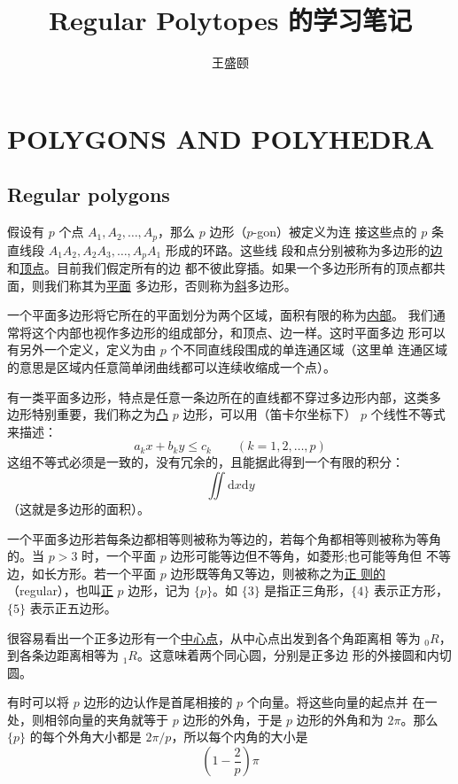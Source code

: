 \documentclass[cs4size,a4paper,adobefonts,openany]{ctexbook}
\newcommand{\pname}[1]{\underline{#1}}
\numberwithin{equation}{section}
\begin{document}
\title{\bfseries Regular Polytopes 的学习笔记}
\author{王盛颐}
\date{}
\maketitle
\setcounter{page}{1}
\chapter{POLYGONS AND POLYHEDRA}
\section{Regular polygons}
假设有 $p$ 个点 $A_1,A_2,\dots,A_p$，那么 $p$ 边形（$p$-gon）被定义为连
接这些点的 $p$ 条直线段 $A_1A_2,A_2A_3,\dots,A_pA_1$ 形成的环路。这些线
段和点分别被称为多边形的\pname{边}和\pname{顶点}。目前我们假定所有的边
都不彼此穿插。如果一个多边形所有的顶点都共面，则我们称其为\pname{平面}
多边形，否则称为\pname{斜}多边形。

一个平面多边形将它所在的平面划分为两个区域，面积有限的称为\pname{内部}。
我们通常将这个内部也视作多边形的组成部分，和顶点、边一样。这时平面多边
形可以有另外一个定义，定义为由 $p$ 个不同直线段围成的单连通区域（这里单
  连通区域的意思是区域内任意简单闭曲线都可以连续收缩成一个点）。

有一类平面多边形，特点是任意一条边所在的直线都不穿过多边形内部，这类多
边形特别重要，我们称之为\pname{凸} $p$ 边形，可以用（笛卡尔坐标下）
$p$ 个线性不等式来描述：
\[
a_kx+b_ky \leq c_k\qquad (k=1,2,\dots,p)
\]
这组不等式必须是一致的，没有冗余的，且能据此得到一个有限的积分：
\[
\iint\text{d}x\text{d}y
\]
（这就是多边形的面积）。

一个平面多边形若每条边都相等则被称为等边的，若每个角都相等则被称为等角
的。当 $p>3$ 时，一个平面 $p$ 边形可能等边但不等角，如菱形;也可能等角但
不等边，如长方形。若一个平面 $p$ 边形既等角又等边，则被称之为\pname{正
  则的} （regular），也叫\pname{正} $p$ 边形，记为 $\{p\}$。如 $\{3\}$
是指正三角形，$\{4\}$ 表示正方形，$\{5\}$ 表示正五边形。

很容易看出一个正多边形有一个\pname{中心点}，从中心点出发到各个角距离相
等为 ${_0R}$，到各条边距离相等为 ${_1R}$。这意味着两个同心圆，分别是正多边
形的外接圆和内切圆。

有时可以将 $p$ 边形的边认作是首尾相接的 $p$ 个向量。将这些向量的起点并
在一处，则相邻向量的夹角就等于 $p$ 边形的外角，于是 $p$ 边形的外角和为
$2\pi$。那么 $\{p\}$ 的每个外角大小都是 $2\pi/p$，所以每个内角的大小是
\begin{equation}
  \label{eq:innerAngle}
  (1-\frac{2}{p})\pi
\end{equation}
\end{document}
